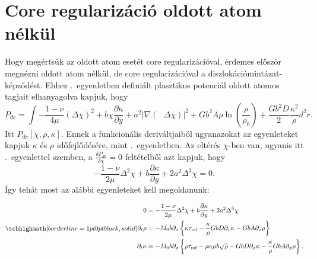 \documentclass[10pt,a4paper]{scrartcl}
\begin{document}
\section{Core regularizáció oldott atom nélkül}
Hogy megértsük az oldott atom esetét core regularizációval, érdemes először megnézni oldott atom nélkül, de core regularizációval a diszlokációmintázat-képződést. Ehhez .\ egyenletben definiált plasztikus potenciál oldott atomos tagjait elhanyagolva kapjuk, hogy 
\begin{equation} \label{eq:plastic_pot_dc}
{P_{dc}} = \int { - \frac{{1 - \nu }}{{4\mu }}{{\left( {\Delta \chi } \right)}^2} + b\chi \frac{{\partial \kappa }}{{\partial y}} + {a^2}{{\left| {\nabla \left( {{\text{ }}\Delta \chi } \right)} \right|}^2} + G{b^2}A\rho \ln \left( {\frac{\rho }{{{\rho _0}}}} \right) + \frac{{G{b^2}D}}{2}\frac{{{\kappa ^2}}}{\rho }{d^2}r}.
\end{equation}
Itt ${P_{dc}}\left[ {\chi ,\rho ,\kappa } \right]$. Ennek a funkcionális deriváltjaiból ugyanazokat az egyenleteket kapjuk $\kappa$ és $\rho$ időfejlődésére, mint .\ egyenletben. Az eltérés $\chi$-ben van, ugyanis itt .\ egyenlettel szemben, a $\frac{{\delta {P_{dc}}}}{{\delta \chi }} = 0$ feltételből azt kapjuk, hogy 
\[ - \frac{{1 - \nu }}{{2\mu }}{\Delta ^2}\chi  + b\frac{{\partial \kappa }}{{\partial y}} + 2{a^2}{\Delta ^3}\chi  = 0.\]
Így tehát most az alábbi egyenleteket kell megoldanunk:

\begin{gather} \label{eq:eom_dc}
\tcbhighmath[borderline={1pt}{0pt}{black,solid}]{
\begin{aligned}
0 & = - \frac{{1 - \nu }}{{2\mu }}{\Delta ^2}\chi  + b\frac{{\partial \kappa }}{{\partial y}} + 2{a^2}{\Delta ^3}\chi  \\ 
    {\partial _t}\rho  &  =  - {M_0}b{\partial _x}\left\{ {\kappa {\tau _{{\text{mf}}}} - \frac{\kappa }{\rho }GbD{\partial _x}\kappa  - GbA{\partial _x}\rho } \right\} \\ 
  {\partial _t}\kappa  &  =  - {M_0}b{\partial _x}\left\{ {\rho {\tau _{{\text{mf}}}} - \rho \alpha \mu b\sqrt \rho - GbD{\partial _x}\kappa  - \frac{\kappa }{\rho } GbA{\partial _x}\rho } \right\}.\\
\end{aligned}  }
\end{gather}
\end{document}
